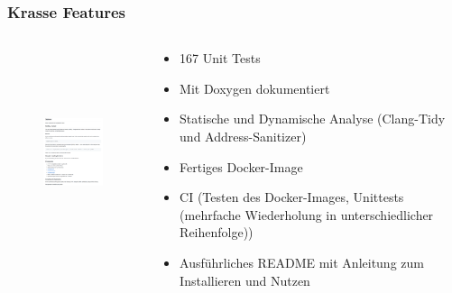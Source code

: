 \documentclass[aspectratio=169]{beamer}
\begin{document}
\begin{frame}
    \frametitle{Krasse Features}
    \begin{columns}
        \begin{column}{0.4\textwidth}
            \begin{center}
                \begin{figure}[H]
                    \includegraphics[height=6cm]{doku.png}
                \end{figure}
            \end{center}
        \end{column}
        \begin{column}{0.6\textwidth}
            \begin{itemize}
                \item 167 Unit Tests %
                    \pause
                \item Mit Doxygen dokumentiert
                    \pause
                \item Statische und Dynamische Analyse (Clang-Tidy und Address-Sanitizer)
                    \pause
                \item Fertiges Docker-Image
                    \pause
                \item CI (Testen des Docker-Images, Unittests (mehrfache Wiederholung in unterschiedlicher Reihenfolge))
                    \pause
                \item Ausführliches README mit Anleitung zum Installieren und Nutzen
            \end{itemize}
        \end{column}
    \end{columns}
\end{frame}
\end{document}
